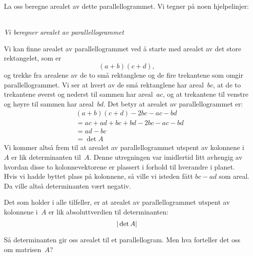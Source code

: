 La oss beregne arealet av dette parallellogrammet.  Vi tegner på noen
hjelpelinjer:
\begin{center}
\\
{\small \textit{Vi beregner arealet av parallellogrammet}}
\end{center}
Vi kan finne arealet av parallellogrammet ved å starte med arealet av
det store rektangelet, som er
\[
(a + b) (c + d),
\]
og trekke fra arealene av de to små rektanglene og de fire trekantene
som omgir parallellogrammet.  Vi ser at hvert av de små rektanglene
har areal~$bc$, at de to trekantene øverst og nederst til sammen har
areal~$ac$, og at trekantene til venstre og høyre til sammen har
areal~$bd$.  Det betyr at arealet av parallellogrammet er:
\begin{align*}
& \!\!\!\!\!\!\!\!(a + b) (c + d) - 2bc - ac - bd \\
&= ac + ad + bc + bd - 2bc - ac - bd \\
&= ad - bc \\
&= \det A
\end{align*}
Vi kommer altså frem til at arealet av parallellogrammet utspent av
kolonnene i~$A$ er lik determinanten til~$A$.  Denne utregningen var
imidlertid litt avhengig av hvordan disse to kolonnevektorene er
plassert i forhold til hverandre i planet.  Hvis vi hadde byttet plass
på kolonnene, så ville vi isteden fått $bc - ad$ som areal.  Da ville
altså determinanten vært negativ.

Det som holder i alle tilfeller, er at arealet av parallellogrammet
utspent av kolonnene i~$A$ er lik absoluttverdien til determinanten:
\[
|\det A|
\]

\medskip

Så determinanten gir oss arealet til et parallellogram.  Men hva
forteller det oss om matrisen~$A$?

